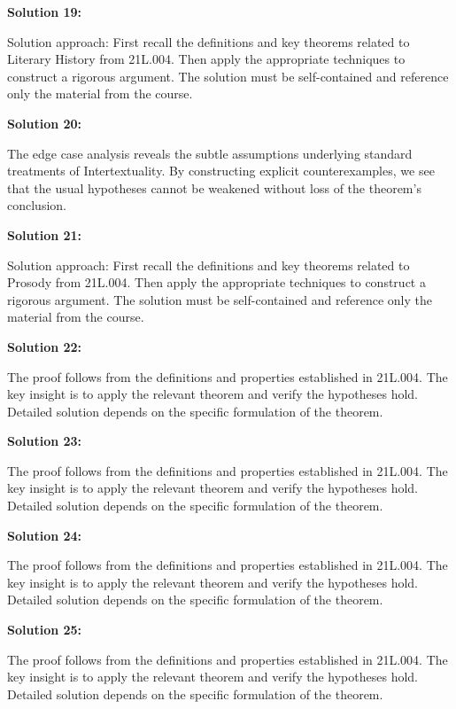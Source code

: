\documentclass[12pt,a4paper]{exam}
\begin{document}
\vspace{0.5cm}

\textbf{Solution 19:}

Solution approach: First recall the definitions and key theorems related to Literary History from 21L.004. Then apply the appropriate techniques to construct a rigorous argument. The solution must be self-contained and reference only the material from the course.

\vspace{0.5cm}

\textbf{Solution 20:}

The edge case analysis reveals the subtle assumptions underlying standard treatments of Intertextuality. By constructing explicit counterexamples, we see that the usual hypotheses cannot be weakened without loss of the theorem's conclusion.

\vspace{0.5cm}

\textbf{Solution 21:}

Solution approach: First recall the definitions and key theorems related to Prosody from 21L.004. Then apply the appropriate techniques to construct a rigorous argument. The solution must be self-contained and reference only the material from the course.

\vspace{0.5cm}

\textbf{Solution 22:}

The proof follows from the definitions and properties established in 21L.004. The key insight is to apply the relevant theorem and verify the hypotheses hold. Detailed solution depends on the specific formulation of the theorem.

\vspace{0.5cm}

\textbf{Solution 23:}

The proof follows from the definitions and properties established in 21L.004. The key insight is to apply the relevant theorem and verify the hypotheses hold. Detailed solution depends on the specific formulation of the theorem.

\vspace{0.5cm}

\textbf{Solution 24:}

The proof follows from the definitions and properties established in 21L.004. The key insight is to apply the relevant theorem and verify the hypotheses hold. Detailed solution depends on the specific formulation of the theorem.

\vspace{0.5cm}

\textbf{Solution 25:}

The proof follows from the definitions and properties established in 21L.004. The key insight is to apply the relevant theorem and verify the hypotheses hold. Detailed solution depends on the specific formulation of the theorem.

\vspace{0.5cm}
\end{document}
